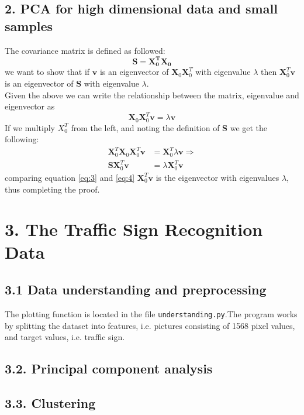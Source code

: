 \documentclass{article}
\begin{document}
\subsection{2. PCA for high dimensional data and small
samples}
The covariance matrix is defined as followed:
\begin{equation}
\mathbf{S} = \mathbf{X_0^T} \mathbf{X_0}
\end{equation}
we want to show that if $\mathbf{v}$ is an eigenvector of $ \mathbf{X}_0 \mathbf{X}_0^T$ with eigenvalue $\lambda$ then $\mathbf{X}_0^T\mathbf{v}$ is an eigenvector of $\mathbf{S}$ with eigenvalue $\lambda$. \\
Given the above we can write the relationship between the matrix, eigenvalue and eigenvector as
\begin{equation}
\mathbf{X}_0 \mathbf{X}_0^T \mathbf{v} = \lambda \mathbf{v}
\label{eq:3}
\end{equation}
If we multiply $X_0^T$ from the left, and noting the definition of $\mathbf{S}$ we get the following:
\begin{align}
\mathbf{X}_0^T \mathbf{X}_0 \mathbf{X}_0^T \mathbf{v} &= \mathbf{X}_0^T \lambda \mathbf{v} \Rightarrow \\
\mathbf{S} \mathbf{X}_0^T \mathbf{v} &= \lambda \mathbf{X}_0^T  \mathbf{v}
\label{eq:4}
\end{align}
comparing equation \ref{eq:3} and \ref{eq:4} $\mathbf{X}_0^T \mathbf{v}$ is the eigenvector with eigenvalues $\lambda$, thus completing the proof.
\section{3. The Traffic Sign Recognition Data}
\subsection{3.1 Data understanding and preprocessing}
The plotting function is located in the file \texttt{understanding.py}.The program works by splitting the dataset into features, i.e. pictures consisting of 1568 pixel values, and target values, i.e. traffic sign.
\subsection{3.2. Principal component analysis}
\subsection{3.3. Clustering}
\end{document}
